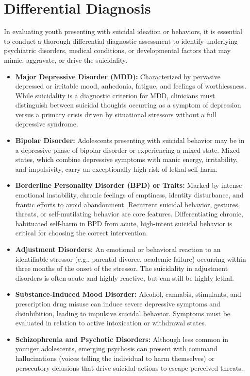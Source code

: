 \section*{Differential Diagnosis}
In evaluating youth presenting with suicidal ideation or behaviors, it is essential to conduct a thorough differential diagnostic assessment to identify underlying psychiatric disorders, medical conditions, or developmental factors that may mimic, aggravate, or drive the suicidality.
\begin{itemize}
    \item \textbf{Major Depressive Disorder (MDD):} Characterized by pervasive depressed or irritable mood, anhedonia, fatigue, and feelings of worthlessness. While suicidality is a diagnostic criterion for MDD, clinicians must distinguish between suicidal thoughts occurring as a symptom of depression versus a primary crisis driven by situational stressors without a full depressive syndrome.
    \item \textbf{Bipolar Disorder:} Adolescents presenting with suicidal behavior may be in a depressive phase of bipolar disorder or experiencing a mixed state. Mixed states, which combine depressive symptoms with manic energy, irritability, and impulsivity, carry an exceptionally high risk of lethal self-harm.
    \item \textbf{Borderline Personality Disorder (BPD) or Traits:} Marked by intense emotional instability, chronic feelings of emptiness, identity disturbance, and frantic efforts to avoid abandonment. Recurrent suicidal behavior, gestures, threats, or self-mutilating behavior are core features. Differentiating chronic, habituated self-harm in BPD from acute, high-intent suicidal behavior is critical for choosing the correct intervention.
    \item \textbf{Adjustment Disorders:} An emotional or behavioral reaction to an identifiable stressor (e.g., parental divorce, academic failure) occurring within three months of the onset of the stressor. The suicidality in adjustment disorders is often acute and highly reactive, but can still be highly lethal.
    \item \textbf{Substance-Induced Mood Disorder:} Alcohol, cannabis, stimulants, and prescription drug misuse can induce severe depressive symptoms and disinhibition, leading to impulsive suicidal behavior. Symptoms must be evaluated in relation to active intoxication or withdrawal states.
    \item \textbf{Schizophrenia and Psychotic Disorders:} Although less common in younger adolescents, emerging psychosis can present with command hallucinations (voices telling the individual to harm themselves) or persecutory delusions that drive suicidal actions to escape perceived threats.

\end{itemize}
